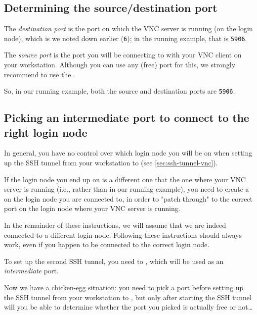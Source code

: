 \subsection{Determining the source/destination port}
\label{sec:source-port-vnc}

The \emph{destination port} is the port on which the VNC server is running (on the login node),
which is  we noted down earlier (\lstinline|6|);
in the running example, that is \lstinline|5906|.

The \emph{source port} is the port you will be connecting to with your VNC client on your workstation.
Although you can use any (free) port for this, we strongly recommend to use the .

So, in our running example, both the source and destination ports are \lstinline|5906|.

\subsection{Picking an intermediate port to connect to the right login node}
\label{sec:intermediate-port-vnc}

In general, you have no control over which login node you will be on when setting up the SSH tunnel from
your workstation to \texttt{\loginnode{}} (see \autoref{sec:ssh-tunnel-vnc}).

If the login node you end up on is a different one that the one where your VNC server is running
(i.e., \texttt{\altloginhost} rather than \texttt{\loginhost} in our running example),
you need to create a  on the login node you are connected to,
in order to "patch through" to the correct port on the login node where your VNC server is running.

In the remainder of these instructions, we will assume that we are indeed connected to a different login node.
Following these instructions should always work, even if you happen to be connected to the correct login node.

To set up the second SSH tunnel, you need to ,
which will be used as an \emph{intermediate} port.

Now we have a chicken-egg situation: you need to pick a port before setting up the SSH tunnel from your workstation
to \texttt{\loginhost}, but only after starting the SSH tunnel will you be able to determine whether the port you
picked is actually free or not\ldots

